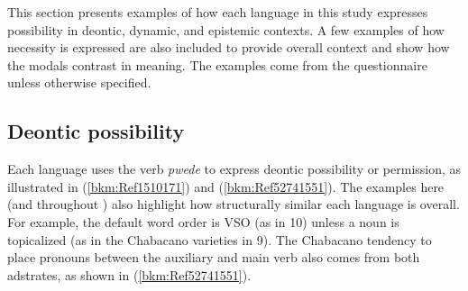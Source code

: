 \documentclass[output=paper,colorlinks,citecolor=brown]{langscibook}
\begin{document}
This section presents examples of how each language in this study expresses possibility in deontic, dynamic, and epistemic contexts. A few examples of how necessity is expressed are also included to provide overall context and show how the modals contrast in meaning. The examples come from the questionnaire unless otherwise specified.

\subsection{Deontic possibility}

Each language uses the verb \textit{pwede} to express deontic possibility or permission, as illustrated in (\ref{bkm:Ref1510171}) and (\ref{bkm:Ref52741551}). The examples here (and throughout ) also highlight how structurally similar each language is overall. For example, the default word order is VSO (as in 10) unless a noun is topicalized (as in the Chabacano varieties in 9). The Chabacano tendency to place pronouns between the auxiliary and main verb also comes from both adstrates, as shown in (\ref{bkm:Ref52741551}).
\end{document}
